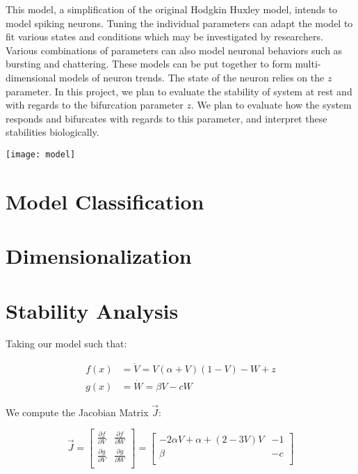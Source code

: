 \documentclass[11pt]{report}
\begin{document}
This model, a simplification of the original Hodgkin Huxley model, intends to model spiking neurons. Tuning the individual parameters can adapt the model to fit various states and conditions which may be investigated by researchers. Various combinations of parameters can also model neuronal behaviors such as bursting and chattering. These models can be put together to form multi-dimensional models of neuron trends. The state of the neuron relies on the $z$ parameter. 
In this project, we plan to evaluate the stability of system at rest and with regards to the bifurcation parameter $z$. We plan to evaluate how the system responds and bifurcates with regards to this parameter, and interpret these stabilities biologically. 

\texttt{[image: model]}


\section{Model Classification} %
\label{sub:model_classification}


\section{Dimensionalization} %
\label{sub:dimensionalization}

\section{Stability Analysis} %
\label{sub:stability_analysis}

Taking our model such that:

$$\begin{aligned}
f(x) &= \dot{V} = V(\alpha + V)(1-V) -W +z \\
g(x) &= \dot{W} = \beta V -cW
\end{aligned}
$$

We compute the Jacobian Matrix $\vec{J}$:


$$
\vec{J} = \begin{bmatrix}
    \frac{\partial f}{\partial{V}} & \frac{\partial f}{\partial{W}} \\
    \frac{\partial g}{\partial{V}} & \frac{\partial g}{\partial{W}} \\
\end{bmatrix} = 
\begin{bmatrix}
    −2\alpha V+\alpha+(2 - 3V)V & -1 \\
    \beta & -c \\
\end{bmatrix}
$$
\end{document}
